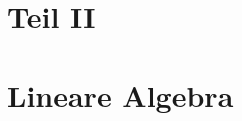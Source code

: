 \documentclass[10pt]{article}
\begin{document}
\section*{Teil II}
\section*{Lineare Algebra}
\end{document}

